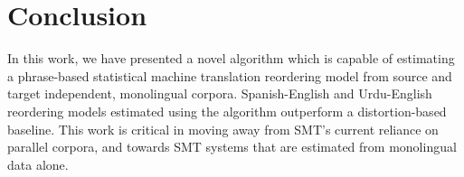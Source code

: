 \documentclass[11pt,letterpaper]{article}
\begin{document}
\section{Conclusion}
In this work, we have presented a novel algorithm which is capable of estimating a phrase-based statistical machine translation reordering model from source and target independent, monolingual corpora. Spanish-English and Urdu-English reordering models estimated using the algorithm outperform a distortion-based baseline. This work is critical in moving away from SMT's current reliance on parallel corpora, and towards SMT systems that are estimated from monolingual data alone. %



\vskip -0.1in



\end{document}
